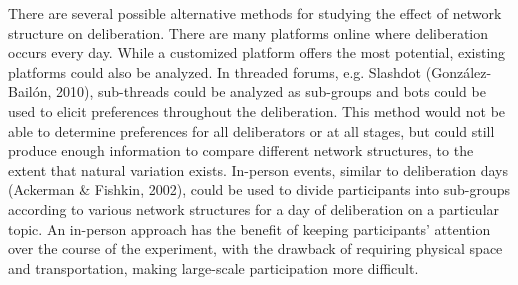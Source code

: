 There are several possible alternative methods for studying the effect of network structure on deliberation. There are many platforms online where deliberation occurs every day. While a customized platform offers the most potential, existing platforms could also be analyzed. In threaded forums, e.g. Slashdot (Gonz\'alez-Bail\'on, 2010), sub-threads could be analyzed as sub-groups and bots could be used to elicit preferences throughout the deliberation. This method would not be able to determine preferences for all deliberators or at all stages, but could still produce enough information to compare different network structures, to the extent that natural variation exists. In-person events, similar to deliberation days (Ackerman \& Fishkin, 2002), could be used to divide participants into sub-groups according to various network structures for a day of deliberation on a particular topic. An in-person approach has the benefit of keeping participants’ attention over the course of the experiment, with the drawback of requiring physical space and transportation, making large-scale participation more difficult.
